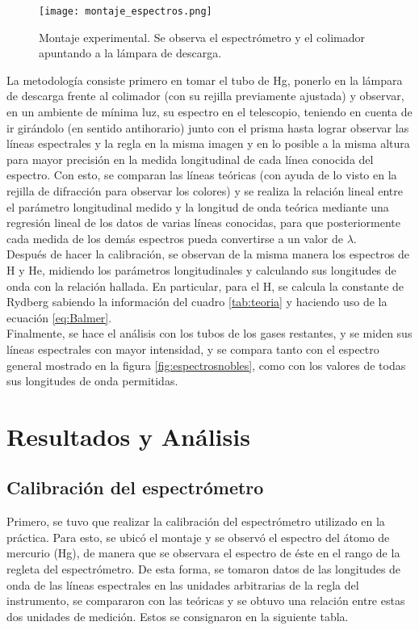 \documentclass[%
 reprint,
 amsmath,amssymb,
 aps,
]{revtex4-1}
\begin{document}
\begin{figure}[H]
    \centering
    \texttt{[image: montaje\_espectros.png]}
    \caption{Montaje experimental. Se observa el espectrómetro y el colimador apuntando a la lámpara de descarga. \cite{guia}}
    \label{fig:montaje}
\end{figure}

La metodología consiste primero en tomar el tubo de Hg, ponerlo en la lámpara de descarga frente al colimador (con su rejilla previamente ajustada) y observar, en un ambiente de mínima luz, su espectro en el telescopio, teniendo en cuenta de ir girándolo (en sentido antihorario) junto con el prisma hasta lograr observar las líneas espectrales y la regla en la misma imagen y en lo posible a la misma altura para mayor precisión en la medida longitudinal de cada línea conocida del espectro. Con esto, se comparan las líneas teóricas (con ayuda de lo visto en la rejilla de difracción para observar los colores) y se realiza la relación lineal entre el parámetro longitudinal medido y la longitud de onda teórica mediante una regresión lineal de los datos de varias líneas conocidas, para que posteriormente cada medida de los demás espectros pueda convertirse a un valor de $\lambda$.\\
Después de hacer la calibración, se observan de la misma manera los espectros de H y He, midiendo los parámetros longitudinales y calculando sus longitudes de onda con la relación hallada. En particular, para el H, se calcula la constante de Rydberg sabiendo la información del cuadro \ref{tab:teoria} y haciendo uso de la ecuación \ref{eq:Balmer}.\\
Finalmente, se hace el análisis con los tubos de los gases restantes, y se miden sus líneas espectrales con mayor intensidad, y se compara tanto con el espectro general mostrado en la figura \ref{fig:espectrosnobles}, como con los valores de todas sus longitudes de onda permitidas. \cite{nobles}

\section{Resultados y Análisis}

\subsection{Calibración del espectrómetro}

Primero, se tuvo que realizar la calibración del espectrómetro utilizado en la práctica. Para esto, se ubicó el montaje y se observó el espectro del átomo de mercurio (Hg), de manera que se observara el espectro de éste en el rango de la regleta del espectrómetro. De esta forma, se tomaron datos de las longitudes de onda de las líneas espectrales en las unidades arbitrarias de la regla del instrumento, se compararon con las teóricas y se obtuvo una relación entre estas dos unidades de medición. Estos se consignaron en la siguiente tabla.
\end{document}
